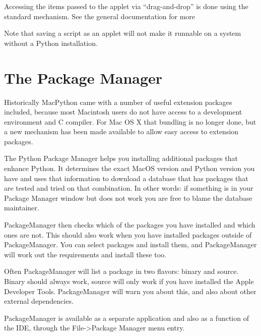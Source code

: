 Accessing the items passed to the applet via ``drag-and-drop'' is done
using the standard  mechanism. See the general
documentation for more

Note that saving a script as an applet will not make it runnable on a
system without a Python installation.

 
 


\section{The Package Manager}

Historically MacPython came with a number of useful extension packages
included, because most Macintosh users do not have access to a development
environment and C compiler. For Mac OS X that bundling is no longer done,
but a new mechanism has been made available to allow easy access to
extension packages.

The Python Package Manager helps you installing additional packages
that enhance Python. It determines the exact MacOS version  and Python
version you have and uses that information to download  a database that
has packages that are tested and tried on that combination. In other
words: if something is in your Package Manager  window but does not work
you are free to blame the database maintainer.

PackageManager then checks which of the packages you have installed  and
which ones are not. This should also work when you have installed packages 
outside of PackageManager.  You can select packages and install them,
and PackageManager will work out the requirements and install these too.

Often PackageManager will list a package in two flavors: binary  and
source. Binary should always work, source will only work if  you have
installed the Apple Developer Tools. PackageManager will warn  you about
this, and also about other external dependencies.

PackageManager is available as a separate application and also  as a
function of the IDE, through the File->Package Manager menu  entry.
